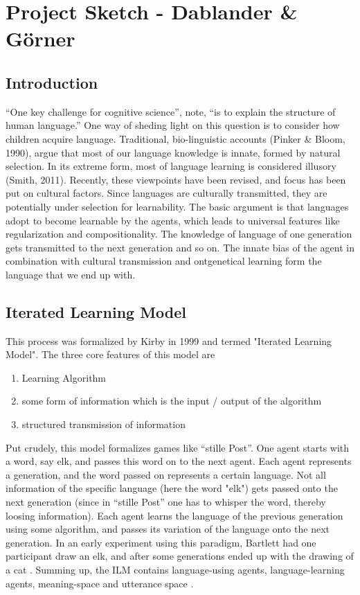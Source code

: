 \documentclass[12pt]{scrartcl}
\begin{document}
\section*{Project Sketch - Dablander \& Görner}

\subsection*{Introduction}
``One key challenge for cognitive science'', \textcite[p. 5241]{kirby2007innateness} note, ``is to explain
the structure of human language.'' One way of sheding light on this question is to consider
how children acquire language. Traditional, bio-linguistic accounts (Pinker \& Bloom, 1990),
argue that most of our language knowledge is innate, formed by natural selection. In its extreme form, most of language learning is considered illusory (Smith, 2011). Recently, these viewpoints have been revised, and focus has been put on cultural factors. Since
languages are culturally transmitted, they are potentially under selection for learnability.
The basic argument is that languages adopt to become learnable by the agents, which leads to
universal features like regularization and compositionality. The knowledge of language of one
generation gets transmitted to the next generation and so on. The innate bias of the agent in combination with cultural transmission and ontgenetical learning form the language that we end up with.

\subsection*{Iterated Learning Model}

This process was formalized by Kirby in 1999 and termed "Iterated Learning Model". The
three core features of this model \parencite{ferdinand2008language} are

\begin{enumerate}
  \item Learning Algorithm
  \item some form of information which is the input / output of the algorithm
  \item structured transmission of information
\end{enumerate}

Put crudely, this model formalizes games like ``stille Post''. One agent starts with
a word, say elk, and passes this word on to the next agent. Each agent represents
a generation, and the word passed on represents a certain language. Not all information of
the specific language (here the word "elk") gets passed onto the next generation (since in
``stille Post'' one has to whisper the word, thereby loosing information). Each agent
learns the language of the previous generation using some algorithm, and passes its variation
of the language onto the next generation. In an early experiment using this paradigm, Bartlett
had one participant draw an elk, and after some generations ended up with the drawing of a cat \parencite{bartlett1932remembering}.
Summing up, the ILM contains language-using agents, language-learning agents, meaning-space and utterance space \parencite{kirby2002emergence}. 
\end{document}
